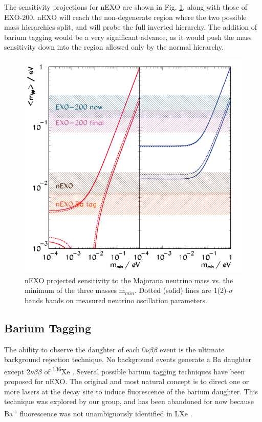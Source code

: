 The sensitivity projections for nEXO are shown in Fig. \ref{fig:sensitivity_nEXO}, along with those of EXO-200.  nEXO will reach the non-degenerate region where the two possible mass hierarchies split, and will probe the full inverted hierarchy.  The addition of barium tagging would be a very significant advance, as it would push the mass sensitivity down into the region allowed only by the normal hierarchy.


\begin{figure} %
	\centering
	\includegraphics[width=.7\textwidth]{figures/sensitivity_v2.png}
	\caption{nEXO projected sensitivity to the Majorana neutrino mass vs. the minimum of the three masses m$_{min}$.  Dotted (solid) lines are 1(2)-$\sigma$ bands bands on measured neutrino oscillation parameters.}
\label{fig:sensitivity_nEXO}
\end{figure}

\subsection{Barium Tagging}

The ability to observe the daughter of each $0\nu\beta\beta$ event is the ultimate background rejection technique.  No background events generate a Ba daughter except $2\nu\beta\beta$ of \textsuperscript{136}Xe \cite{Moe1991}.  Several possible barium tagging techniques have been proposed for nEXO.  The original and most natural concept is to direct one or more lasers at the decay site to induce fluorescence of the barium daughter.  This technique was explored by our group, and has been abandoned for now because Ba\textsuperscript{+} fluorescence was not unambiguously identified in LXe \cite{Kendy}.

